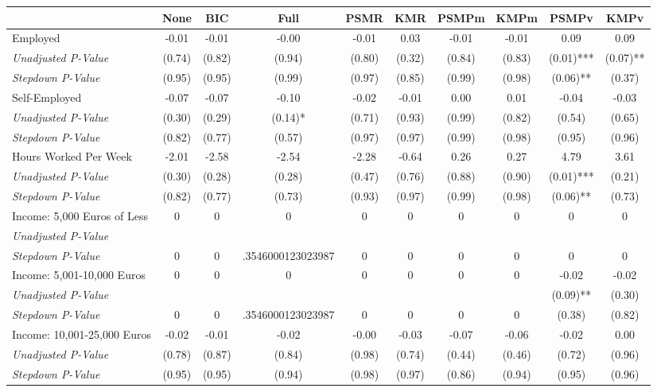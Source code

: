 \begin{tabular}{l c c c c c c c c c}
\toprule
 & None & BIC & Full & PSMR & KMR & PSMPm & KMPm & PSMPv & KMPv \\
\midrule
Employed & -0.01 & -0.01 & -0.00 & -0.01 & 0.03 & -0.01 & -0.01 & 0.09 & 0.09 \\
\quad \textit{Unadjusted P-Value} & (0.74) & (0.82) & (0.94) & (0.80) & (0.32) & (0.84) & (0.83) & (0.01)*** & (0.07)** \\
\quad \textit{Stepdown P-Value} & (0.95) & (0.95) & (0.99) & (0.97) & (0.85) & (0.99) & (0.98) & (0.06)** & (0.37) \\
Self-Employed & -0.07 & -0.07 & -0.10 & -0.02 & -0.01 & 0.00 & 0.01 & -0.04 & -0.03 \\
\quad \textit{Unadjusted P-Value} & (0.30) & (0.29) & (0.14)* & (0.71) & (0.93) & (0.99) & (0.82) & (0.54) & (0.65) \\
\quad \textit{Stepdown P-Value} & (0.82) & (0.77) & (0.57) & (0.97) & (0.97) & (0.99) & (0.98) & (0.95) & (0.96) \\
Hours Worked Per Week & -2.01 & -2.58 & -2.54 & -2.28 & -0.64 & 0.26 & 0.27 & 4.79 & 3.61 \\
\quad \textit{Unadjusted P-Value} & (0.30) & (0.28) & (0.28) & (0.47) & (0.76) & (0.88) & (0.90) & (0.01)*** & (0.21) \\
\quad \textit{Stepdown P-Value} & (0.82) & (0.77) & (0.73) & (0.93) & (0.97) & (0.99) & (0.98) & (0.06)** & (0.73) \\
Income: 5,000 Euros of Less & 0 & 0 & 0 & 0 & 0 & 0 & 0 & 0 & 0 \\
\quad \textit{Unadjusted P-Value} & & & & & & & & & \\
\quad \textit{Stepdown P-Value} & 0 & 0 & .3546000123023987 & 0 & 0 & 0 & 0 & 0 & 0 \\
Income: 5,001-10,000 Euros & 0 & 0 & 0 & 0 & 0 & 0 & 0 & -0.02 & -0.02 \\
\quad \textit{Unadjusted P-Value} & & & & & & & & (0.09)** & (0.30) \\
\quad \textit{Stepdown P-Value} & 0 & 0 & .3546000123023987 & 0 & 0 & 0 & 0 & (0.38) & (0.82) \\
Income: 10,001-25,000 Euros & -0.02 & -0.01 & -0.02 & -0.00 & -0.03 & -0.07 & -0.06 & -0.02 & 0.00 \\
\quad \textit{Unadjusted P-Value} & (0.78) & (0.87) & (0.84) & (0.98) & (0.74) & (0.44) & (0.46) & (0.72) & (0.96) \\
\quad \textit{Stepdown P-Value} & (0.95) & (0.95) & (0.94) & (0.98) & (0.97) & (0.86) & (0.94) & (0.95) & (0.96) \\

\end{tabular}
